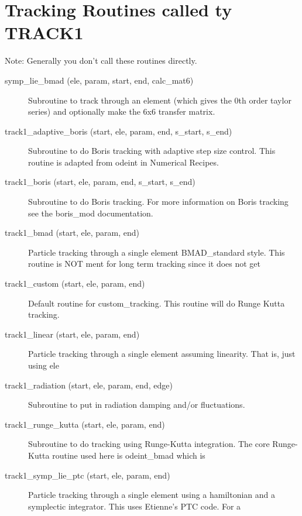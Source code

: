 \section{Tracking Routines called ty TRACK1}
\label{r:track1}   

Note: Generally you don't call these routines directly.

\begin{description}

\item[symp\_lie\_bmad (ele, param, start, end, calc\_mat6)] \Newline
Subroutine to track through an element (which gives the 0th order taylor 
series) and optionally make the 6x6 transfer matrix. 

\item[track1\_adaptive\_boris (start, ele, param, end, s\_start, s\_end)] \Newline
Subroutine to do Boris tracking with adaptive step size control. 
This routine is adapted from odeint in Numerical Recipes. 

\item[track1\_boris (start, ele, param, end, s\_start, s\_end)] \Newline
Subroutine to do Boris tracking. For more information on Boris tracking 
see the boris\_mod documentation. 

\item[track1\_bmad (start, ele, param, end)] \Newline
Particle tracking through a single element BMAD\_standard style. This 
routine is NOT ment for long term tracking since it does not get 

\item[track1\_custom (start, ele, param, end)] \Newline
Default routine for custom\_tracking. This routine will do Runge Kutta tracking. 

\item[track1\_linear (start, ele, param, end)] \Newline
Particle tracking through a single element assuming linearity. That is, 
just using ele%

\item[track1\_radiation (start, ele, param, end, edge)] \Newline
Subroutine to put in radiation damping and/or fluctuations. 

\item[track1\_runge\_kutta (start, ele, param, end)] \Newline
Subroutine to do tracking using Runge-Kutta integration. The core 
Runge-Kutta routine used here is odeint\_bmad which is 

\item[track1\_symp\_lie\_ptc (start, ele, param, end)] \Newline
Particle tracking through a single element using a hamiltonian and a 
symplectic integrator. This uses Etienne's PTC code. For a 


\end{description}
